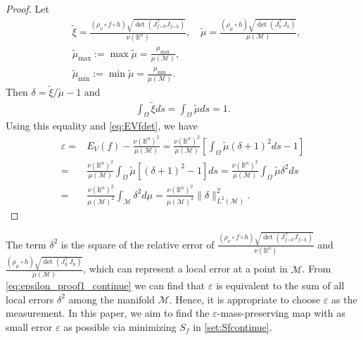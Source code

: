 \documentclass{article}
\begin{document}
\begin{proof}
Let
\begin{align}
&\tilde{\xi} = \frac{(\rho_\nu \circ f \circ h) \sqrt{\det(J_{f\circ h}^\top J_{f\circ h})}}{\nu(\mathbb{B}^n)},\quad
\tilde{\mu} = \frac{(\rho_\mu \circ h) \sqrt{\det(J_{h}^\top J_h)}}{\mu(\mathcal{M})},\\
& \tilde{\mu}_{\text{max}} := \max \tilde{\mu} = \frac{\mu_{\text{max}}}{\mu(\mathcal{M})}, \label{eq:tildemumax}\\
&\tilde{\mu}_{\text{min}} := \min \tilde{\mu} = \frac{\mu_{\text{min}}}{\mu(\mathcal{M})}. \label{eq:tildemumin}
\end{align}
Then $\delta = \tilde{\xi} / \tilde{\mu} - 1$ and
\begin{align}
    \int_\Omega \tilde{\xi} ds = \int_\Omega \tilde{\mu} ds = 1.
\end{align}
Using this equality and \eqref{eq:EVfdet}, we have
\begin{align}
    \varepsilon = & E_V(f) - \frac{\nu(\mathbb{B}^n)^2}{\mu(\mathcal{M})}
    =  \frac{\nu(\mathbb{B}^n)^2}{\mu(\mathcal{M})} \left[ \int_\Omega
    \tilde{\mu}(\delta + 1)^2 ds - 1 \right]\\
    = & \frac{\nu(\mathbb{B}^n)^2}{\mu(\mathcal{M})} \int_\Omega
    \tilde{\mu}[(\delta+1)^2 - 1] ds
    = \frac{\nu(\mathbb{B}^n)^2}{\mu(\mathcal{M})} \int_\Omega
    \tilde{\mu}\delta^2 ds\\
    =& \frac{\nu(\mathbb{B}^n)^2}{\mu(\mathcal{M})^2} \int_\mathcal{M} \delta^2 d\mu = \frac{\nu(\mathbb{B}^n)^2}{\mu(\mathcal{M})^2} \|\delta\|_{L^2(\mathcal{M})}^2.  \label{eq:epsilon_proof1_continue}
\end{align}

\end{proof}



The term $\delta^2$ is the square of the relative error of $\frac{(\rho_\nu \circ f \circ h)\sqrt{\det(J_{f\circ h}^\top J_{f\circ h})}}{\nu(\mathbb{B}^n)}$ and $\frac{(\rho_\mu \circ h) \sqrt{\det(J_{h}^\top J_h)}}{\mu(\mathcal{M})}$, which can represent a local error at a point in $\mathcal{M}$. From \eqref{eq:epsilon_proof1_continue} we can find that $\varepsilon$ is equivalent to the sum of all local errors $\delta^2$ among the manifold $\mathcal{M}$. Hence, it is appropriate to choose $\varepsilon$ as the measurement. In this paper, we aim to find the $\varepsilon$-mass-preserving map with as small error $\varepsilon$ as possible via minimizing $S_f$ in \eqref{set:Sfcontinue}.
\end{document}
